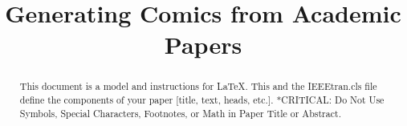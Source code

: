 \documentclass[conference]{IEEEtran}
\begin{document}
\title{Generating Comics from Academic Papers}

\author{
}

\maketitle

\begin{abstract}
This document is a model and instructions for \LaTeX.
This and the IEEEtran.cls file define the components of your paper [title, text, heads, etc.]. *CRITICAL: Do Not Use Symbols, Special Characters, Footnotes,
or Math in Paper Title or Abstract.
\end{abstract}














\end{document}

